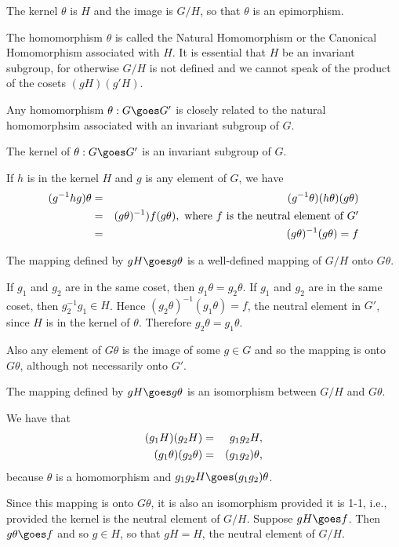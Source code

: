 \begin{corollary}
The kernel $\theta$ is $H$ and the image is $G/H$, so that $\theta$ is an epimorphism.
\end{corollary}

The homomorphism $\theta$ is called the Natural Homomorphism or the Canonical Homomorphism associated with $H$. It is essential that $H$ be an invariant subgroup, for otherwise $G/H$ is not defined and we cannot speak of the product of the cosets $(gH)(g'H)$.

Any homomorphism $\theta: G\goes G'$ is closely related to the natural homomorphsim associated with an invariant subgroup of $G$. 

\begin{theorem}
The kernel of $\theta: G \goes G'$ is an invariant subgroup of $G$. 
\end{theorem}

If $h$ is in the kernel $H$ and $g$ is any element of $G$, we have
\begin{eqnarray*}
(g^{-1} h g)\theta  &=& (g^{-1}\theta) (h\theta) (g\theta)\cr
&=& (g\theta)^{-1}) f (g\theta), \mbox{  where $f$ is the neutral element of $G'$}\cr
&=& (g\theta)^{-1}(g\theta) = f
\end{eqnarray*}

\begin{theorem}
The mapping defined by $gH \goes g\theta$ is a well-defined mapping of $G/H$ onto $G\theta$.
\end{theorem}
If $g_1$ and $g_2$ are in the same coset, then $g_1\theta = g_2\theta$. If $g_1$ and $g_2$ are in the same coset, then $g_2^{-1}g_1 \in H$. Hence
$(g_2\theta)^{-1}(g_1\theta) = f$, the neutral element in $G'$, since $H$ is in the kernel of $\theta$. Therefore $g_2\theta = g_1\theta$. 

Also  any element of $G\theta$ is the image of some $g\in G$ and so the mapping is onto $G\theta$, although not necessarily onto $G'$. 

\begin{theorem}
The mapping defined by $gH \goes g\theta$ is an isomorphism between $G/H$ and $G\theta$. 
\end{theorem}
We have that 
\begin{eqnarray*}
(g_1 H) (g_2 H) &=& g_1 g_2 H, \cr
(g_1\theta) (g_2\theta) &=& (g_1 g_2)\theta, 
\end{eqnarray*}
because $\theta$ is a homomorphism and $g_1 g_2 H \goes (g_1 g_2)\theta$. 

Since this mapping is onto $G\theta$, it is also an isomorphism provided it is 1-1, i.e., provided the kernel is the neutral element of $G/H$. Suppose
$gH \goes f$. Then $g\theta \goes f$ and so $g\in H$, so that $gH = H$, the neutral element of $G/H$. \\

